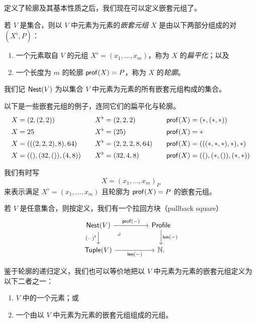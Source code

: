 定义了轮廓及其基本性质之后，我们现在可以定义嵌套元组了。

\begin{definition}\label{definitionofnestedtuple}
    若 $V$ 是集合，则以 $V$ 中元素为元素的{\it 嵌套元组} $X$ 是由以下两部分组成的对 $(X^\flat,P)$：
    \begin{enumerate}
        \item 一个元素取自 $V$ 的元组 $X^\flat = (x_1,\dots,x_m)$，称为 $X$ 的{\it 扁平化}；以及
        \item 一个长度为 $m$ 的轮廓 $\mathsf{prof}(X) = P$，称为 $X$ 的{\it 轮廓}。
    \end{enumerate}
    我们记 $\mathsf{Nest}(V)$ 为以集合 $V$ 中元素为元素的所有嵌套元组构成的集合。
\end{definition}

\begin{example} 以下是一些嵌套元组的例子，连同它们的扁平化与轮廓。
\[
\begin{aligned}
X &= (2,(2,2)) \quad & X^\flat &= (2,2,2) \quad & \mathsf{prof}(X) & = (*,(*,*)) \\
X & = 25 \quad & X^\flat & = (25) \quad & \mathsf{prof}(X) & = * \\
X & = (((2,2,2),8),64) \quad & X^\flat & = (2,2,2,8,64) \quad & \mathsf{prof}(X) & = (((*,*,*),*),*)\\
X & = ((),(32,()),(4,8)) \quad & X^\flat & = (32,4,8) \quad & \mathsf{prof}(X) & = ((),(*,()),(*,*))
\end{aligned}
\]
\end{example}

\begin{notation}
    我们有时写
    \[X = (x_1,\dots,x_m)_P\]
    来表示满足 $X^\flat = (x_1,\dots,x_m)$ 且轮廓为 $\mathsf{prof}(X) = P$ 的嵌套元组。
\end{notation}

\begin{observation}\label{nesttuplepullbacksquare}
    若 $V$ 是任意集合，则按定义，我们有一个拉回方块（pullback square）
    \[ \begin{tikzcd}
    \mathterm{Nest}(V) \ar[rr,"\profile(-)"] \ar[d,swap,"(-)^\flat"] \arrow[drr, phantom, "\lrcorner", very near start] & & \mathterm{Profile} \ar[d,"\len(-)"] \\
    \mathterm{Tuple}(V) \ar[rr,swap,"\len(-)"] & & \mathbb{N}.
    \end{tikzcd} \]
\end{observation}


\begin{remark}
    鉴于轮廓的递归定义，我们也可以等价地把以 $V$ 中元素为元素的嵌套元组定义为以下二者之一：
    \begin{enumerate}
        \item $V$ 中的一个元素；或
        \item 一个由以 $V$ 中元素为元素的嵌套元组组成的元组。
    \end{enumerate}
\end{remark}

